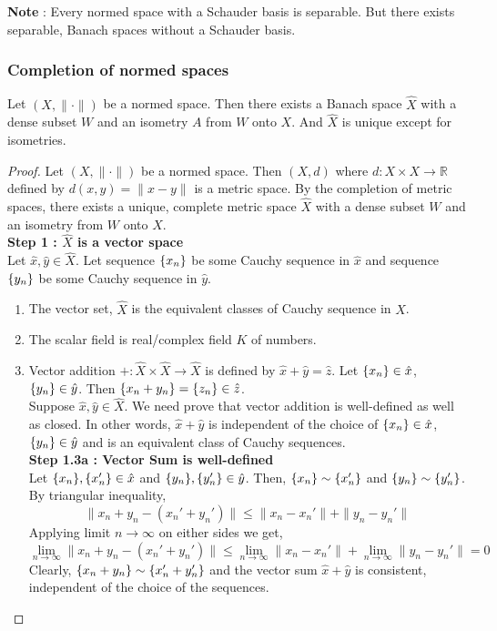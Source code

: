 \textbf{Note} : Every normed space with a Schauder basis is separable.
But there exists separable, Banach spaces without a Schauder basis.

\subsubsection{Completion of normed spaces}
\begin{theorem}[completion]
	Let $(X,\|\cdot\|)$ be a normed space.
	Then there exists a Banach space $\hat{X}$ with a dense subset $W$ and an isometry $A$ from $W$ onto $X$.
	And $\hat{X}$ is unique except for isometries.
\end{theorem}
\begin{proof}
	Let $(X,\|\cdot\|)$ be a normed space.
	Then $(X,d)$ where $d : X \times X \to \mathbb{R}$ defined by $d(x,y) = \| x-y \|$ is a metric space.
	By the completion of metric spaces, there exists a unique, complete metric space $\hat{X}$ with a dense subset $W$ and an isometry from $W$ onto $X$.\\

	\textbf{Step 1 : $\hat{X}$ is a vector space}\\
	Let $\hat{x},\hat{y} \in \hat{X}$.
	Let sequence $\{x_n\}$ be some Cauchy sequence in $\hat{x}$ and sequence $\{y_n\}$ be some Cauchy sequence in $\hat{y}$.
	\begin{enumerate}
		\item The vector set, $\hat{X}$ is the equivalent classes of Cauchy sequence in $X$.
		\item The scalar field is real/complex field $K$ of numbers.
		\item Vector addition $+ : \hat{X} \times \hat{X} \to \hat{X}$ is defined by $\hat{x} + \hat{y} = \hat{z}$.
			Let $\{x_n\} \in \hat{x}$, $\{y_n\} \in \hat{y}$.
			Then $\{x_n+y_n\} = \{z_n\} \in \hat{z}$.\\

			Suppose $\hat{x},\hat{y} \in \hat{X}$.
			We need prove that vector addition is well-defined as well as closed.
			In other words, $\hat{x}+\hat{y}$ is independent of the choice of $\{x_n\} \in \hat{x}$, $\{y_n\} \in \hat{y}$ and is an equivalent class of Cauchy sequences.\\

			\textbf{Step 1.3a : Vector Sum is well-defined}\\
			Let $\{x_n\},\{x_n'\} \in \hat{x}$ and $\{y_n\},\{y_n'\} \in \hat{y}$.
			Then, $\{x_n\} \sim \{x_n'\}$ and $\{y_n\} \sim \{y_n'\}$.
			By triangular inequality,
			$$ \| x_n + y_n - (x_n' + y_n') \| \le \| x_n - x_n'\| + \| y_n - y_n' \| $$
			Applying limit $n \to \infty $ on either sides we get,
			$$ \lim_{n \to \infty} \| x_n + y_n - (x_n'+y_n') \| \le \lim_{n \to \infty} \| x_n - x_n' \| + \lim_{n \to \infty} \| y_n - y_n' \| = 0 $$
			Clearly, $\{x_n+y_n\} \sim \{x_n'+y_n'\}$ and the vector sum $\hat{x}+\hat{y}$ is consistent, independent of the choice of the sequences.\\


\end{enumerate}
\end{proof}
